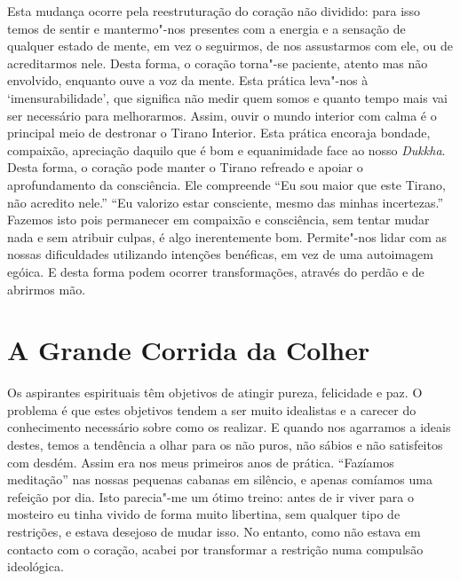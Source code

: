 Esta mudança ocorre pela reestruturação do coração não dividido: para
isso temos de sentir e mantermo"-nos presentes com a energia e a sensação
de qualquer estado de mente, em vez o seguirmos, de nos assustarmos com
ele, ou de acreditarmos nele. Desta forma, o coração torna"-se paciente,
atento mas não envolvido, enquanto ouve a voz da mente. Esta prática
leva"-nos à `imensurabilidade', que significa não medir quem somos e
quanto tempo mais vai ser necessário para melhorarmos. Assim, ouvir o
mundo interior com calma é o principal meio de destronar o Tirano
Interior. Esta prática encoraja bondade, compaixão, apreciação daquilo
que é bom e equanimidade face ao nosso \emph{Dukkha}. Desta forma, o
coração pode manter o Tirano refreado e apoiar o aprofundamento da
consciência. Ele compreende “Eu sou maior que este Tirano, não acredito
nele.” “Eu valorizo estar consciente, mesmo das minhas incertezas.”
Fazemos isto pois permanecer em compaixão e consciência, sem tentar
mudar nada e sem atribuir culpas, é algo inerentemente bom. Permite"-nos
lidar com as nossas dificuldades utilizando intenções benéficas, em vez
de uma autoimagem egóica. E desta forma podem ocorrer transformações,
através do perdão e de abrirmos mão.

\section{A Grande Corrida da Colher}

Os aspirantes espirituais têm objetivos de atingir pureza, felicidade e
paz. O problema é que estes objetivos tendem a ser muito idealistas e a
carecer do conhecimento necessário sobre como os realizar. E quando nos
agarramos a ideais destes, temos a tendência a olhar para os não puros,
não sábios e não satisfeitos com desdém. Assim era nos meus primeiros
anos de prática. “Fazíamos meditação” nas nossas pequenas cabanas em
silêncio, e apenas comíamos uma refeição por dia. Isto parecia"-me um
ótimo treino: antes de ir viver para o mosteiro eu tinha vivido de forma
muito libertina, sem qualquer tipo de restrições, e estava desejoso de
mudar isso. No entanto, como não estava em contacto com o coração,
acabei por transformar a restrição numa compulsão ideológica.

